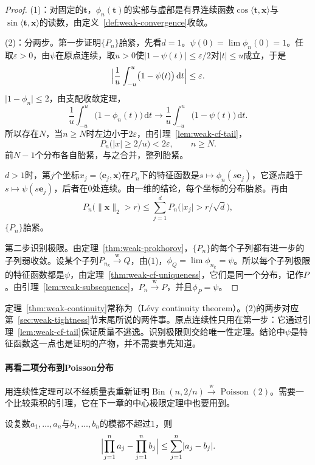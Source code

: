 \begin{proof}
(1)：对固定的$\bm{t}$，$\phi_n(\bm{t})$的实部与虚部是有界连续函数$\cos\langle\bm{t},\bm{x}\rangle$与$\sin\langle\bm{t},\bm{x}\rangle$的读数，由定义~\ref{def:weak-convergence}收敛。

(2)：分两步。第一步证明$\{P_n\}$胎紧，先看$d=1$。$\psi(0)=\lim\phi_n(0)=1$。任取$\varepsilon>0$，由$\psi$在原点连续，取$u>0$使$\lvert1-\psi(t)\rvert\leq\varepsilon/2$对$\lvert t\rvert\leq u$成立，于是
\[
 \Bigl\lvert\frac1u\int_{-u}^{u}\bigl(1-\psi(t)\bigr)\,\mathrm{d}t\Bigr\rvert\leq\varepsilon .
\]
$\lvert1-\phi_n\rvert\leq2$，由支配收敛定理，
\[
 \frac1u\int_{-u}^{u}\bigl(1-\phi_n(t)\bigr)\,\mathrm{d}t\longrightarrow\frac1u\int_{-u}^{u}\bigl(1-\psi(t)\bigr)\,\mathrm{d}t .
\]
所以存在$N$，当$n\geq N$时左边小于$2\varepsilon$，由引理~\ref{lem:weak-cf-tail}，
\[
 P_n\bigl(\lvert x\rvert\geq2/u\bigr)<2\varepsilon,\qquad n\geq N .
\]
前$N-1$个分布各自胎紧，与之合并，整列胎紧。

$d>1$时，第$j$个坐标$x_j=\langle\bm{e}_j,\bm{x}\rangle$在$P_n$下的特征函数是$s\mapsto\phi_n(s\bm{e}_j)$，它逐点趋于$s\mapsto\psi(s\bm{e}_j)$，后者在$0$处连续。由一维的结论，每个坐标的分布胎紧。再由
\[
 P_n\bigl(\lVert\bm{x}\rVert_2>r\bigr)\leq\sum_{j=1}^{d}P_n\bigl(\lvert x_j\rvert>r/\sqrt{d}\bigr) ,
\]
$\{P_n\}$胎紧。

第二步识别极限。由定理~\ref{thm:weak-prokhorov}，$\{P_n\}$的每个子列都有进一步的子列弱收敛。设某个子列$P_{n_k}\xrightarrow{\mathrm{w}}Q$，由(1)，$\phi_Q=\lim\phi_{n_k}=\psi$。所以每个子列极限的特征函数都是$\psi$，由定理~\ref{thm:weak-cf-uniqueness}，它们是同一个分布，记作$P$。由引理~\ref{lem:weak-subsequence}，$P_n\xrightarrow{\mathrm{w}}P$，并且$\phi_P=\psi$。
\end{proof}

定理~\ref{thm:weak-continuity}常称为（Lévy continuity theorem）。(2)的两步对应第~\ref{sec:weak-tightness}节末尾所说的两件事。原点连续性只用在第一步：它通过引理~\ref{lem:weak-cf-tail}保证质量不逃逸。识别极限则交给唯一性定理。结论中$\psi$是特征函数这一点也是证明的产物，并不需要事先知道。

\paragraph{再看二项分布到Poisson分布}
用连续性定理可以不经质量表重新证明$\operatorname{Bin}(n,2/n)\xrightarrow{\mathrm{w}}\operatorname{Poisson}(2)$。需要一个比较乘积的引理，它在下一章的中心极限定理中也要用到。

\begin{lemma}[乘积之差]
\label{lem:weak-product-difference}
设复数$a_1,\dots,a_n$与$b_1,\dots,b_n$的模都不超过$1$，则
\begin{equation}
 \Bigl\lvert\prod_{j=1}^{n}a_j-\prod_{j=1}^{n}b_j\Bigr\rvert\leq\sum_{j=1}^{n}\lvert a_j-b_j\rvert .
 \label{eq:weak-product-difference}
\end{equation}
\end{lemma}

